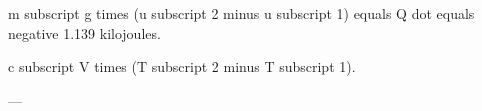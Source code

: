 m subscript g times (u subscript 2 minus u subscript 1) equals Q dot equals negative 1.139 kilojoules.  

c subscript V times (T subscript 2 minus T subscript 1).  

---